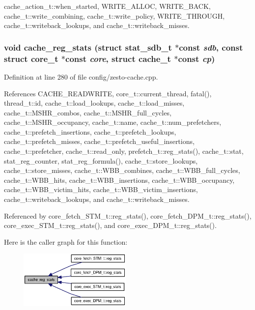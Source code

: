 cache\_\-action\_\-t::when\_\-started, WRITE\_\-ALLOC, WRITE\_\-BACK, cache\_\-t::write\_\-combining, cache\_\-t::write\_\-policy, WRITE\_\-THROUGH, cache\_\-t::writeback\_\-lookups, and cache\_\-t::writeback\_\-misses.
\subsubsection[{cache\_\-reg\_\-stats}]{\setlength{\rightskip}{0pt plus 5cm}void cache\_\-reg\_\-stats (struct {\bf stat\_\-sdb\_\-t} $\ast$const  {\em sdb}, \/  const struct {\bf core\_\-t} $\ast$const  {\em core}, \/  struct {\bf cache\_\-t} $\ast$const  {\em cp})}\label{zesto-cache_8h_80141f1bc8f06e0805162cdd6936c5d8}




Definition at line 280 of file config/zesto-cache.cpp.

References CACHE\_\-READWRITE, core\_\-t::current\_\-thread, fatal(), thread\_\-t::id, cache\_\-t::load\_\-lookups, cache\_\-t::load\_\-misses, cache\_\-t::MSHR\_\-combos, cache\_\-t::MSHR\_\-full\_\-cycles, cache\_\-t::MSHR\_\-occupancy, cache\_\-t::name, cache\_\-t::num\_\-prefetchers, cache\_\-t::prefetch\_\-insertions, cache\_\-t::prefetch\_\-lookups, cache\_\-t::prefetch\_\-misses, cache\_\-t::prefetch\_\-useful\_\-insertions, cache\_\-t::prefetcher, cache\_\-t::read\_\-only, prefetch\_\-t::reg\_\-stats(), cache\_\-t::stat, stat\_\-reg\_\-counter, stat\_\-reg\_\-formula(), cache\_\-t::store\_\-lookups, cache\_\-t::store\_\-misses, cache\_\-t::WBB\_\-combines, cache\_\-t::WBB\_\-full\_\-cycles, cache\_\-t::WBB\_\-hits, cache\_\-t::WBB\_\-insertions, cache\_\-t::WBB\_\-occupancy, cache\_\-t::WBB\_\-victim\_\-hits, cache\_\-t::WBB\_\-victim\_\-insertions, cache\_\-t::writeback\_\-lookups, and cache\_\-t::writeback\_\-misses.

Referenced by core\_\-fetch\_\-STM\_\-t::reg\_\-stats(), core\_\-fetch\_\-DPM\_\-t::reg\_\-stats(), core\_\-exec\_\-STM\_\-t::reg\_\-stats(), and core\_\-exec\_\-DPM\_\-t::reg\_\-stats().

Here is the caller graph for this function:\nopagebreak
\begin{figure}[H]
\begin{center}
\leavevmode
\includegraphics[width=156pt]{zesto-cache_8h_80141f1bc8f06e0805162cdd6936c5d8_icgraph}
\end{center}
\end{figure}
